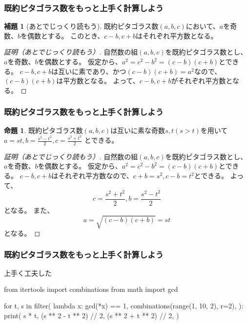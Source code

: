 \documentclass[dvipdfmx,11pt,notheorems]{beamer}
\theoremstyle{definition}
\newtheorem{proposition}{命題}
\newtheorem{lemma}{補題}
\begin{document}
\begin{frame}\frametitle{既約ピタゴラス数をもっと上手く計算しよう}
\begin{lemma}[あとでじっくり読もう]
既約ピタゴラス数$(a, b, c)$において、$a$を奇数、$b$を偶数とする。
このとき、$c-b, c+b$はそれぞれ平方数となる。
\end{lemma}

\begin{proof}[証明（あとでじっくり読もう）]
自然数の組$(a, b, c)$を既約ピタゴラス数とし、$a$を奇数、$b$を偶数とする。
仮定から、$a^{2} = c^{2} -b^{2} = (c-b)(c+b)$とできる。
$c-b, c+b$は互いに素であり、かつ$(c-b)(c+b)=a^{2}$なので、$(c-b)(c+b)$は平方数となる。
よって、$c-b, c+b$がそれぞれ平方数となる。
\end{proof}

\end{frame}


\begin{frame}\frametitle{既約ピタゴラス数をもっと上手く計算しよう}

\begin{proposition}
既約ピタゴラス数$(a, b, c)$は互いに素な奇数$s, t (s > t)$を用いて 
$a = st, b = \displaystyle \frac{s^{2}-t^{2}}{2}, c = \displaystyle \frac{s^{2}+t^{2}}{2}$
とできる。
\end{proposition}

\begin{proof}[証明（あとでじっくり読もう）]
自然数の組$(a, b, c)$を既約ピタゴラス数とし、$a$を奇数、$b$を偶数とする。
仮定から、$a^{2} = c^{2} -b^{2} = (c-b)(c+b)$とできる。
$c-b, c+b$はそれぞれ平方数なので、$c+b=s^{2}, c-b=t^{2}$とできる。
よって、
\begin{equation*}
c = \frac{s^{2} + t^{2}}{2}, b = \frac{s^{2} - t^{2}}{2}
\end{equation*}
となる。
また、
\begin{equation*}
a = \sqrt{(c-b)(c+b)} = st
\end{equation*}
となる。
\end{proof}

\end{frame}



\begin{frame}[fragile]\frametitle{既約ピタゴラス数をもっと上手く計算しよう}

\begin{block}{上手く工夫した}
\begin{pyverbatim}
from itertools import combinations
from math import gcd

for t, s in filter(
    lambda x: gcd(*x) == 1,
    combinations(range(1, 10, 2), r=2),
):
    print(
        s * t,
        (s ** 2 - t ** 2) // 2,
        (s ** 2 + t ** 2) // 2,
    )
\end{pyverbatim}
\end{block}

\end{frame}
\end{document}
